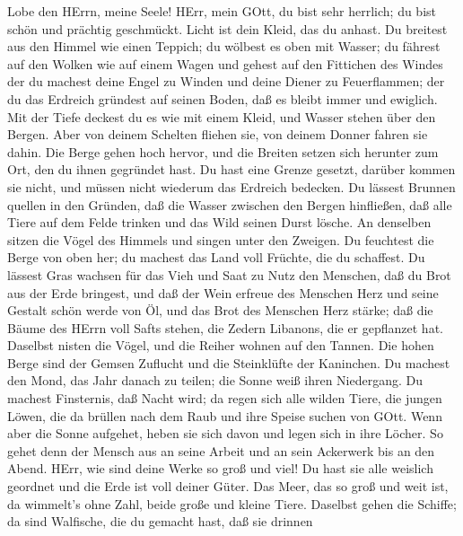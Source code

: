  Lobe den HErrn, meine Seele! HErr, mein GOtt, du bist sehr
herrlich; du bist schön und prächtig geschmückt.  Licht ist
dein Kleid, das du anhast. Du breitest aus den Himmel wie einen Teppich;
 du wölbest es oben mit Wasser; du fährest auf den Wolken
wie auf einem Wagen und gehest auf den Fittichen des Windes 
der du machest deine Engel zu Winden und deine Diener zu Feuerflammen;
 der du das Erdreich gründest auf seinen Boden, daß es
bleibt immer und ewiglich.  Mit der Tiefe deckest du es wie
mit einem Kleid, und Wasser stehen über den Bergen.  Aber
von deinem Schelten fliehen sie, von deinem Donner fahren sie dahin.
 Die Berge gehen hoch hervor, und die Breiten setzen sich
herunter zum Ort, den du ihnen gegründet hast.  Du hast eine
Grenze gesetzt, darüber kommen sie nicht, und müssen nicht wiederum das
Erdreich bedecken.  Du lässest Brunnen quellen in den
Gründen, daß die Wasser zwischen den Bergen hinfließen, 
daß alle Tiere auf dem Felde trinken und das Wild seinen Durst lösche.
 An denselben sitzen die Vögel des Himmels und singen unter
den Zweigen.  Du feuchtest die Berge von oben her; du
machest das Land voll Früchte, die du schaffest.  Du
lässest Gras wachsen für das Vieh und Saat zu Nutz den Menschen, daß du
Brot aus der Erde bringest,  und daß der Wein erfreue des
Menschen Herz und seine Gestalt schön werde von Öl, und das Brot des
Menschen Herz stärke;  daß die Bäume des HErrn voll Safts
stehen, die Zedern Libanons, die er gepflanzet hat. 
Daselbst nisten die Vögel, und die Reiher wohnen auf den Tannen.
 Die hohen Berge sind der Gemsen Zuflucht und die
Steinklüfte der Kaninchen.  Du machest den Mond, das Jahr
danach zu teilen; die Sonne weiß ihren Niedergang.  Du
machest Finsternis, daß Nacht wird; da regen sich alle wilden Tiere,
 die jungen Löwen, die da brüllen nach dem Raub und ihre
Speise suchen von GOtt.  Wenn aber die Sonne aufgehet,
heben sie sich davon und legen sich in ihre Löcher.  So
gehet denn der Mensch aus an seine Arbeit und an sein Ackerwerk bis an
den Abend.  HErr, wie sind deine Werke so groß und viel! Du
hast sie alle weislich geordnet und die Erde ist voll deiner Güter.
 Das Meer, das so groß und weit ist, da wimmelt's ohne
Zahl, beide große und kleine Tiere.  Daselbst gehen die
Schiffe; da sind Walfische, die du gemacht hast, daß sie drinnen
